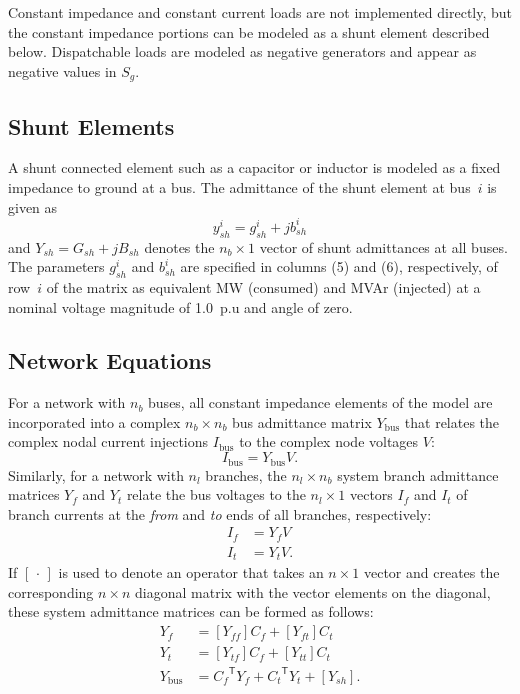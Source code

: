 \documentclass[12pt]{article}
\newcommand{\code}[1]{{\relsize{-0.5}{\tt{{#1}}}}}  %
\newcommand{\bus}[0]{\code{bus}}
\newcommand{\trans}[1]{{#1}^{\ensuremath{\mathsf{T}}}}  %
\newcommand{\diag}[1]{\left[{#1}\right]}                %
\numberwithin{equation}{section}
\numberwithin{table}{section}
\numberwithin{figure}{section}
\begin{document}
Constant impedance and constant current loads are not implemented directly, but the constant impedance portions can be modeled as a shunt element described below. Dispatchable loads are modeled as negative generators and appear as negative values in $S_g$.


\subsection{Shunt Elements}

A shunt connected element such as a capacitor or inductor is modeled as a fixed impedance to ground at a bus. The admittance of the shunt element at bus~$i$ is given as
\begin{equation}
y^i_{sh} = g^i_{sh} + j b^i_{sh}
\end{equation}
and $Y_{sh} = G_{sh} + j B_{sh}$ denotes the $n_b \times 1$ vector of shunt admittances at all buses. The parameters $g^i_{sh}$ and $b^i_{sh}$ are specified in columns \code{GS} (5) and \code{BS} (6), respectively, of row~$i$ of the \bus{} matrix as equivalent MW (consumed) and MVAr (injected) at a nominal voltage magnitude of 1.0~p.u and angle of zero.


\subsection{Network Equations}

For a network with $n_b$ buses, all constant impedance elements of the model are incorporated into a complex $n_b \times n_b$ bus admittance matrix $Y_\mathrm{bus}$ that relates the complex nodal current injections $I_\mathrm{bus}$ to the complex node voltages $V$:
\begin{equation}
I_\mathrm{bus} = Y_\mathrm{bus} V. \label{eq:Ibus}
\end{equation}
Similarly, for a network with $n_l$ branches, the $n_l \times n_b$ system branch admittance matrices $Y_f$ and $Y_t$ relate the bus voltages to the $n_l \times 1$ vectors $I_f$ and $I_t$ of branch currents at the \emph{from} and \emph{to} ends of all branches, respectively:
\begin{align}
I_f &= Y_f V \label{eq:If} \\
I_t &= Y_t V. \label{eq:It}
\end{align}
If $\diag{\,\cdot\,}$ is used to denote an operator that takes an $n \times 1$ vector and creates the corresponding $n \times n$ diagonal matrix with the vector elements on the diagonal, these system admittance matrices can be formed as follows:
\begin{align}
Y_f &= \diag{ Y_{f\!f} } C_f + \diag{ Y_{ft} } C_t \label{eq:Yf} \\
Y_t &= \diag{ Y_{t\!f} } C_f + \diag{ Y_{tt} } C_t \label{eq:Yt} \\
Y_\mathrm{bus} &= \trans{C_f \!} Y_f + \trans{C_t \!} Y_t + \diag{ Y_{sh} }. \label{eq:Ybus}
\end{align}
\end{document}
